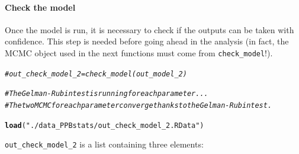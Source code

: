 \documentclass{book}\usepackage[]{graphicx}\usepackage[]{color}
\makeatletter
\newcommand{\hlstr}[1]{\textcolor[rgb]{0.192,0.494,0.8}{#1}}%
\newcommand{\hlcom}[1]{\textcolor[rgb]{0.678,0.584,0.686}{\textit{#1}}}%
\newcommand{\hlstd}[1]{\textcolor[rgb]{0.345,0.345,0.345}{#1}}%
\newcommand{\hlkwd}[1]{\textcolor[rgb]{0.737,0.353,0.396}{\textbf{#1}}}%
\newenvironment{kframe}{%
 \def\at@end@of@kframe{}%
 \ifinner\ifhmode%
  \def\at@end@of@kframe{\end{minipage}}%
  \begin{minipage}{\columnwidth}%
 \fi\fi%
 \def\FrameCommand##1{\hskip\@totalleftmargin \hskip-\fboxsep
 \colorbox{shadecolor}{##1}\hskip-\fboxsep
     \hskip-\linewidth \hskip-\@totalleftmargin \hskip\columnwidth}%
 \MakeFramed {\advance\hsize-\width
   \@totalleftmargin\z@ \linewidth\hsize
   \@setminipage}}%
 {\par\unskip\endMakeFramed%
 \at@end@of@kframe}
\newenvironment{knitrout}{}{} %
\makeatother
\begin{document}
\paragraph{Check the model}

Once the model is run, it is necessary to check if the outputs can be taken with confidence. 
This step is needed before going ahead in the analysis (in fact, the MCMC object used in the next functions must come from \texttt{check\_model}!).


\begin{knitrout}
\color{fgcolor}\begin{kframe}
\begin{alltt}
\hlcom{# out_check_model_2 = check_model(out_model_2)}

\hlcom{# The Gelman-Rubin test is running for each parameter ...}
\hlcom{# The two MCMC for each parameter converge thanks to the Gelman-Rubin test.}

\hlkwd{load}\hlstd{(}\hlstr{"./data_PPBstats/out_check_model_2.RData"}\hlstd{)}
\end{alltt}
\end{kframe}
\end{knitrout}

\texttt{out\_check\_model\_2} is a list containing three elements:
\end{document}
